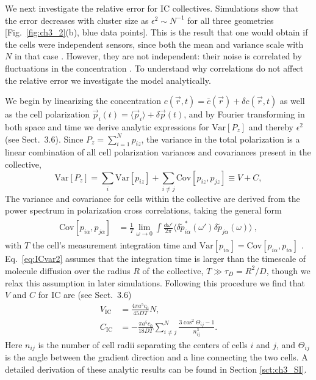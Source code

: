 We next investigate the relative error for IC collectives. Simulations show that the error decreases with cluster size as
$\epsilon^2 \sim N^{-1}$
for all three geometries [Fig.\ \ref{fig:ch3_2}(b), blue data points]. This is the result that one would obtain if the cells were independent sensors, since both the mean and variance scale with $N$ in that case \cite{simons2004many}. However, they are not independent: their noise is correlated by fluctuations in the concentration \cite{fancher2016fundamental,mugler2016limits}. To understand why correlations do not affect the relative error we investigate the model analytically.

We begin by linearizing the concentration $c(\vec{r},t) = \bar{c}(\vec{r}) + \delta c(\vec{r},t)$ as well as the cell polarization
$\vec{p}_i(t) = \langle \vec{p}_i \rangle + \delta\vec{p}(t)$,
and by Fourier transforming in both space and time we derive analytic expressions for
$\text{Var}[P_z]$ and thereby $\epsilon^2$ (see Sect.\ 3.6). Since
$P_z = \sum_{i=1}^N p_{iz}$,
the variance in the total polarization is a linear combination of all cell polarization variances and covariances present in the collective,
\begin{equation} \label{eq:ICvar1}
    \text{Var}[P_z] =
    \sum_{i} \text{Var}[p_{iz}]
    + \sum_{i\neq j} \text{Cov}[p_{iz},p_{jz}]
    \equiv V + C ,
\end{equation}
The variance and covariance for cells within the collective are derived from the power spectrum in polarization cross correlations, taking the general form
\begin{align} \label{eq:ICvar2}
\begin{split}
    \text{Cov}[p_{i\alpha},p_{j\alpha}] &= \frac{1}{T}
    \lim_{\omega \to 0} \int \frac{d\omega'}{2\pi}
    \langle\delta\tilde{p}_{i\alpha}^*(\omega')\delta\tilde{p}_{j\alpha}(\omega) \rangle
    \ ,
\end{split}
\end{align}
with $T$ the cell's measurement integration time and $\text{Var}[p_{i\alpha}] = \text{Cov}[p_{i\alpha},p_{i\alpha}]$ \cite{fancher2016fundamental,mugler2016limits,bialek2005physical}. Eq.\ \ref{eq:ICvar2} assumes that the integration time is larger than the timescale of molecule diffusion over the radius $R$ of the collective,
$T \gg \tau_D = R^2/D$, though we relax this assumption in later simulations.
Following this procedure we find that $V$ and $C$ for IC are (see Sect.\ 3.6)
\begin{align}
    V_\text{IC} &= \frac{4\pi a^5c_0}{45DT} N  \label{eq:ICV} , \\
    C_\text{IC} &= -\frac{\pi a^5c_0}{18DT} \sum_{i \neq j}^N \frac{3\cos^2\Theta_{ij}-1}{n^3_{ij}} . \label{eq:ICC}
\end{align}
Here
$n_{ij}$
is the number of cell radii separating the centers of cells $i$ and $j$, and $\Theta_{ij}$ is the angle between the gradient direction and a line connecting the two cells. A detailed derivation of these analytic results can be found in Section \ref{sct:ch3_SI}.

